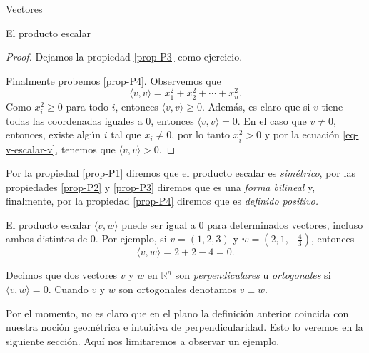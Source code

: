 \begin{chapter}{Vectores}
\begin{section}{El producto escalar}
\begin{proof}
        Dejamos la propiedad \ref{prop-P3} como ejercicio.
        
        Finalmente probemos \ref{prop-P4}. Observemos que 
        \begin{equation}\label{eq-v-escalar-v}
            \langle v , v \rangle = x_1^2 + x_2^2 + \cdots + x_n^2.
        \end{equation}
        Como $x_i^2 \ge 0$ para todo $i$,  entonces $\langle v , v \rangle \ge 0$. Además, es claro que si $v$ tiene todas las coordenadas iguales a 0,  entonces  $\langle v , v \rangle =0$. En  el caso que $v\not=0$, entonces,  existe algún $i$  tal que  $x_i \ne 0$, por lo tanto $x_i^2>0$ y por la ecuación \eqref{eq-v-escalar-v}, tenemos que  $\langle v , v \rangle>0$.
    \end{proof}

        Por  la propiedad \ref{prop-P1} diremos que el producto escalar es \textit{simétrico}, por las propiedades  \ref{prop-P2} y \ref{prop-P3} diremos que es una \textit{forma bilineal} y, finalmente, por la propiedad \ref{prop-P4} diremos que es \textit{definido positivo.} 
        
        El producto escalar $\langle v , w \rangle$ puede ser  igual a 0 para determinados  vectores,  incluso ambos distintos de 0.  Por ejemplo, si $v = (1,2,3)$ y $w = (2, 1, -\frac43)$,  entonces
        \begin{equation*}
            \langle v , w \rangle = 2 + 2 -4 =0.
        \end{equation*}
        \begin{definicion}
            Decimos que dos vectores $v$ y $w$ en $\mathbb R^n$ son  \textit{perpendiculares} u \textit{ortogonales} si  $\langle v , w \rangle=0$. Cuando $v$ y $w$ son ortogonales  denotamos $v \perp w$.
        \end{definicion}
        
        Por el momento, no es claro que en el plano la definición anterior coincida con nuestra noción geométrica e intuitiva de perpendicularidad. Esto lo veremos en la siguiente sección. Aquí nos limitaremos a observar un ejemplo.
        

\end{section}
\end{chapter}
